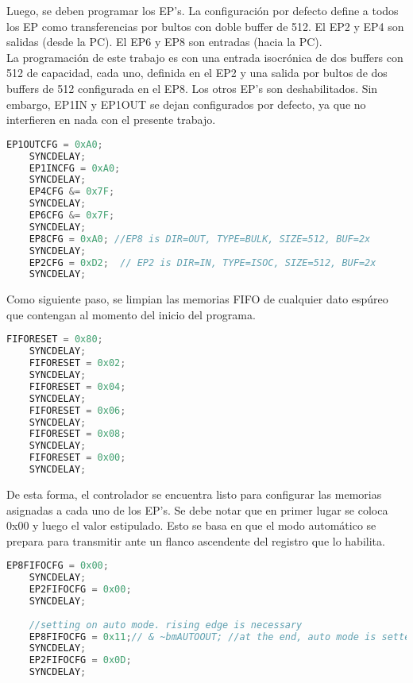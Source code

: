 	Luego, se deben programar los EP's. La configuración por defecto define a todos los EP como transferencias por bultos con doble buffer de \SI{512}{\byte}. El EP2 y EP4 son salidas (desde la PC). El EP6 y EP8 son entradas (hacia la PC).\\
	
	La programación de este trabajo es con una entrada isocrónica de dos buffers con \SI{512}{\byte} de capacidad, cada uno, definida en el EP2 y una salida por bultos de dos buffers de \SI{512}{\byte} configurada en el EP8. Los otros EP's son deshabilitados. Sin embargo, EP1IN y EP1OUT se dejan configurados por defecto, ya que no interfieren en nada con el presente trabajo.
	
%	
	\begin{lstlisting}[language=C,backgroundcolor=\color{gray!30}]
	EP1OUTCFG = 0xA0;
	SYNCDELAY;
	EP1INCFG = 0xA0;
	SYNCDELAY;
	EP4CFG &= 0x7F;
	SYNCDELAY;
	EP6CFG &= 0x7F;
	SYNCDELAY;
	EP8CFG = 0xA0; //EP8 is DIR=OUT, TYPE=BULK, SIZE=512, BUF=2x
	SYNCDELAY;
	EP2CFG = 0xD2;  // EP2 is DIR=IN, TYPE=ISOC, SIZE=512, BUF=2x
	SYNCDELAY;
	\end{lstlisting}
	
	Como siguiente paso, se limpian las memorias FIFO de cualquier dato espúreo que contengan al momento del inicio del programa.
	
	\begin{lstlisting}[language=C,backgroundcolor=\color{gray!30}]
	FIFORESET = 0x80;
	SYNCDELAY;
	FIFORESET = 0x02;
	SYNCDELAY;
	FIFORESET = 0x04;
	SYNCDELAY;
	FIFORESET = 0x06;
	SYNCDELAY;
	FIFORESET = 0x08;
	SYNCDELAY;
	FIFORESET = 0x00;
	SYNCDELAY;
	\end{lstlisting}
	
	De esta forma, el controlador se encuentra listo para configurar las memorias asignadas a cada uno de los EP's. Se debe notar que en primer lugar se coloca 0x00 y luego el valor estipulado. Esto se basa en que el modo automático se prepara para transmitir ante un flanco ascendente del registro que lo habilita.
	
%	
	\begin{lstlisting}[language=C,backgroundcolor=\color{gray!30}]
	EP8FIFOCFG = 0x00;
	SYNCDELAY;
	EP2FIFOCFG = 0x00;
	SYNCDELAY;
	
	//setting on auto mode. rising edge is necessary
	EP8FIFOCFG = 0x11;// & ~bmAUTOOUT; //at the end, auto mode is setted off
	SYNCDELAY;
	EP2FIFOCFG = 0x0D;
	SYNCDELAY;
	\end{lstlisting}

